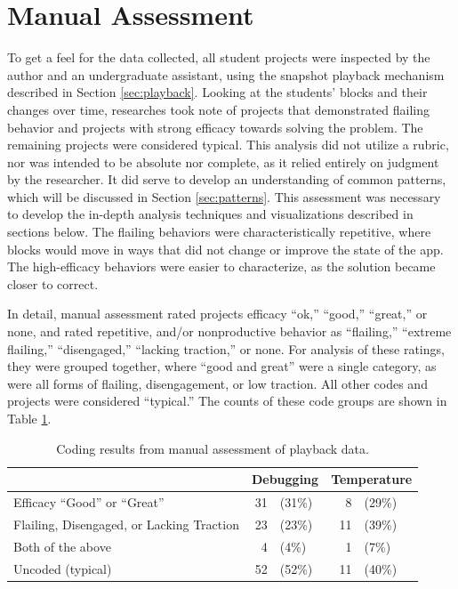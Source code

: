 \section{Manual Assessment}
\label{sec:manual-assessment}
To get a feel for the data collected, all student projects were inspected by the author and an undergraduate assistant, using the snapshot playback mechanism described in Section \ref{sec:playback}. Looking at the students' blocks and their changes over time, researches took note of projects that demonstrated flailing behavior and projects with strong efficacy towards solving the problem. The remaining projects were considered typical. This analysis did not utilize a rubric, nor was intended to be absolute nor complete, as it relied entirely on judgment by the researcher. It did serve to develop an understanding of common patterns, which will be discussed in Section \ref{sec:patterns}. This assessment was necessary to develop the in-depth analysis techniques and visualizations described in sections below. The flailing behaviors were characteristically repetitive, where blocks would move in ways that did not change or improve the state of the app. The high-efficacy behaviors were easier to characterize, as the solution became closer to correct.

In detail, manual assessment rated projects efficacy ``ok,'' ``good,'' ``great,'' or none, and rated repetitive, and/or nonproductive behavior as ``flailing,'' ``extreme flailing,'' ``disengaged,'' ``lacking traction,'' or none. For analysis of these ratings, they were grouped together, where ``good and great'' were a single category, as were all forms of flailing, disengagement, or low traction. All other codes and projects were considered ``typical.'' The counts of these code groups are shown in Table \ref{tab:manual-percentages}.

\begin{table}
\begin{centering}
	\begin{tabular}{l rl rl}
													& \multicolumn{2}{c}{Debugging} & \multicolumn{2}{c}{Temperature}  \\ \hline
		Efficacy ``Good'' or ``Great''				& 31 	& (31\%) 	& 8 	& (29\%) 	\\
		Flailing, Disengaged, or Lacking Traction	& 23 	& (23\%)	& 11 	& (39\%)	\\
		Both of the above							& 4 	& (4\%)		& 1 	& (7\%)		\\
		Uncoded	(typical)							& 52 	& (52\%)	& 11	& (40\%)

	\end{tabular}
	\caption[Coding Results from Manual Assessment of Playback Data]{Coding results from manual assessment of playback data.}
	\label{tab:manual-percentages}
\end{centering}
\end{table}

